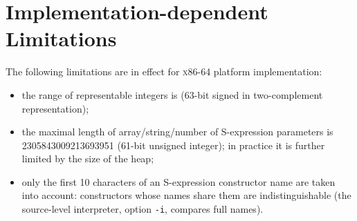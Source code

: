 \chapter{Implementation-dependent Limitations}
\label{sec:limitations}

The following limitations are in effect for \textsc{x86-64} platform implementation:

\begin{itemize}
\item the range of representable integers is \newline [-4611686018427387904..4611686018427387903] (63-bit signed in two-complement representation);
\item the maximal length of array/string/number of S-expression parameters is 2305843009213693951 (61-bit unsigned integer); in practice
  it is further limited by the size of the heap;
\item only the first 10 characters of an S-expression constructor name are taken into account: constructors whose names share
  them are indistinguishable (the source-level interpreter, option \lstinline|-i|, compares full names).
\end{itemize}
